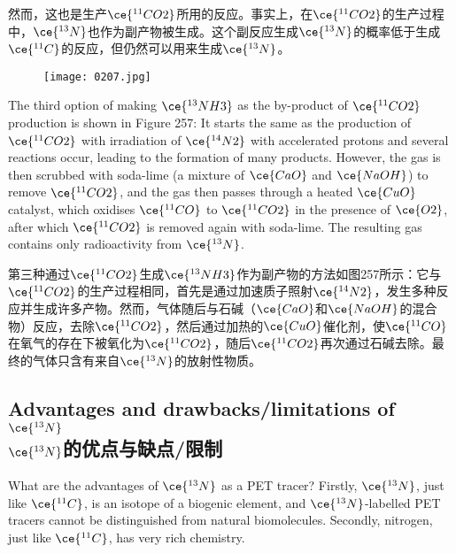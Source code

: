 \documentclass[dvipsnames, svgnames,a4paper,11pt]{article}
\begin{document}
然而，这也是生产\(\ce{^{11}CO2}\)所用的反应。事实上，在\(\ce{^{11}CO2}\)的生产过程中，\(\ce{^{13}N}\)也作为副产物被生成。这个副反应生成\(\ce{^{13}N}\)的概率低于生成\(\ce{^{11}C}\)的反应，但仍然可以用来生成\(\ce{^{13}N}\)。

\begin{figure}[h]
	\centering
    \texttt{[image: 0207.jpg]}  
     \label{fig257}
\end{figure}

The third option of making \(\ce{^{13}NH3}\) as the by-product of \(\ce{^{11}CO2}\) production is shown in Figure 257: It starts the same as the production of \(\ce{^{11}CO2}\) with irradiation of \(\ce{^{14}N2}\) with accelerated protons and several reactions occur, leading to the formation of many products. However, the gas is then scrubbed with soda-lime (a mixture of \(\ce{CaO}\) and \(\ce{NaOH}\)) to remove \(\ce{^{11}CO2}\), and the gas then passes through a heated \(\ce{CuO}\) catalyst, which oxidises \(\ce{^{11}CO}\) to \(\ce{^{11}CO2}\) in the presence of \(\ce{O2}\), after which \(\ce{^{11}CO2}\) is removed again with soda-lime. The resulting gas contains only radioactivity from \(\ce{^{13}N}\).

第三种通过\(\ce{^{11}CO2}\)生成\(\ce{^{13}NH3}\)作为副产物的方法如图257所示：它与\(\ce{^{11}CO2}\)的生产过程相同，首先是通过加速质子照射\(\ce{^{14}N2}\)，发生多种反应并生成许多产物。然而，气体随后与石碱（\(\ce{CaO}\)和\(\ce{NaOH}\)的混合物）反应，去除\(\ce{^{11}CO2}\)，然后通过加热的\(\ce{CuO}\)催化剂，使\(\ce{^{11}CO}\)在氧气的存在下被氧化为\(\ce{^{11}CO2}\)，随后\(\ce{^{11}CO2}\)再次通过石碱去除。最终的气体只含有来自\(\ce{^{13}N}\)的放射性物质。

\subsection{Advantages and drawbacks/limitations of \(\ce{^{13}N}\)\\ \(\ce{^{13}N}\)的优点与缺点/限制}  

What are the advantages of \(\ce{^{13}N}\) as a PET tracer? Firstly, \(\ce{^{13}N}\), just like \(\ce{^{11}C}\), is an isotope of a biogenic element, and \(\ce{^{13}N}\)-labelled PET tracers cannot be distinguished from natural biomolecules. Secondly, nitrogen, just like \(\ce{^{11}C}\), has very rich chemistry.
\end{document}
